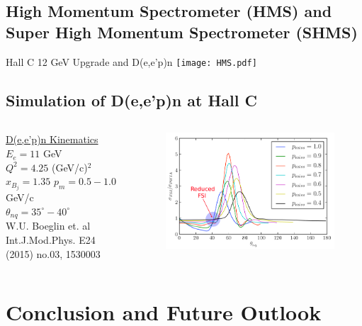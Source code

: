 \documentclass{beamer}
\begin{document}
\subsection{High Momentum Spectrometer (HMS) and Super High Momentum Spectrometer (SHMS)}

\begin{frame}{{Hall C 12 GeV Upgrade and D(e,e'p)n}}
\centering
\hspace{1.0cm}\texttt{[image: HMS.pdf]} 
\end{frame}

\subsection{Simulation of D(e,e'p)n at Hall C}

\begin{frame}
\begin{columns}
\footnotesize
\underline{D(e,e'p)n Kinematics}
$E_{e}=11$ GeV \\
$Q^{2}=4.25$ (GeV/c)$^{2}$ \\
$x_{B_{j}}=1.35$
$p_{m} = 0.5 - 1.0$ GeV/c \\
$\theta_{nq} = 35^{\circ} - 40^{\circ}$ \\
\vspace{5mm}
W.U. Boeglin et. al \\
Int.J.Mod.Phys. E24 \\
(2015) no.03, 1530003 
\begin{figure}[t!]
\hspace{-0.89cm}\includegraphics[width=8.18cm]{ang_dist2.png} 
\end{figure}
\end{columns} 
\end{frame}

\section{Conclusion and Future Outlook}
\end{document}
